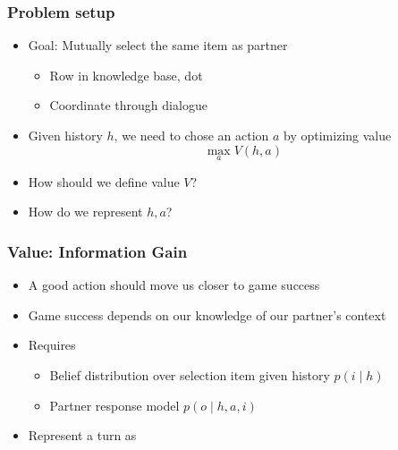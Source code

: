 \documentclass{beamer}
\begin{document}
\begin{frame}
\frametitle{Problem setup}
\begin{itemize}
\item Goal: Mutually select the same item as partner
    \begin{itemize}
    \item Row in knowledge base, dot
    \item Coordinate through dialogue
    \end{itemize}
\item Given history $h$,
we need to chose an action $a$ by optimizing value
\begin{equation*}
\max_a V(h, a)
\end{equation*}
\item How should we define value $V$?
\item How do we represent $h,a$?
\end{itemize}
\end{frame}


\begin{frame}
\frametitle{Value: Information Gain}
\begin{itemize}
\item A good action should move us closer to game success
\item Game success depends on our knowledge of our partner's context
\item Requires
    \begin{itemize}
    \item Belief distribution over selection item given history $p(i \mid h)$
    \item Partner response model $p(o \mid h, a, i)$
    \end{itemize}
\item Represent a turn as

\begin{center}
\end{center}

\end{itemize}
\end{frame}
\end{document}

